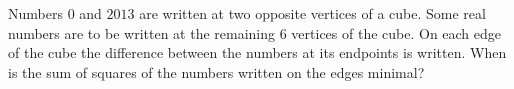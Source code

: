 Numbers $0$ and $2013$ are written at two opposite vertices of a cube. Some real numbers are to be written at the remaining $6$ vertices of the cube. On each edge of the cube the difference between the numbers at its endpoints is written. When is the sum of squares of the numbers written on the edges minimal?